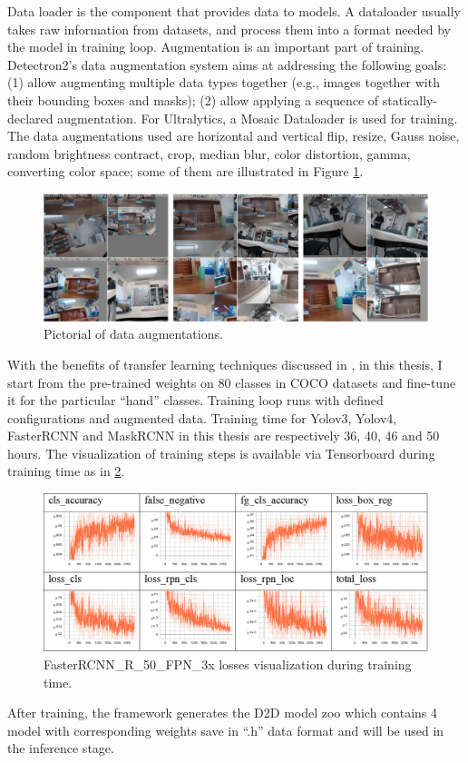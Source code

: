 Data loader is the component that provides data to models. A dataloader usually takes raw information from datasets, and process them into a format needed by the model in training loop. Augmentation is an important part of training. Detectron2’s data augmentation system aims at addressing the following goals: (1) allow augmenting multiple data types together (e.g., images together with their bounding boxes and masks); (2) allow applying a sequence of statically-declared augmentation. For Ultralytics, a Mosaic Dataloader is used for training. The data augmentations used are horizontal and vertical flip, resize, Gauss noise, random brightness contract, crop, median blur, color distortion, gamma, converting color space; some of them are illustrated in Figure \ref{fig:augmentation}.
\begin{figure}
	\centerline{\includegraphics[width=1\linewidth]{Figs/augmentation.png}}
	\caption{Pictorial of data augmentations.}
	\label{fig:augmentation}
\end{figure}
With the benefits of transfer learning techniques discussed in \cite{DBLP:journals/corr/abs-1808-01974}, in this thesis, I start from the pre-trained weights on 80 classes in COCO datasets and fine-tune it for the particular “hand” classes. Training loop runs with defined configurations and augmented data. Training time for Yolov3, Yolov4, FasterRCNN and MaskRCNN in this thesis are respectively 36, 40, 46 and 50 hours.
The visualization of training steps is available via Tensorboard during training time as in \ref{fig:tensorboard}.
\begin{figure}
	\centerline{\includegraphics[width=1\linewidth]{Figs/tensorboard.png}}
	\caption{FasterRCNN\_R\_50\_FPN\_3x losses visualization during training time.}
	\label{fig:tensorboard}
\end{figure}
After training, the framework generates the D2D model zoo which contains 4 model with corresponding weights save in “.h” data format and will be used in the inference stage.
